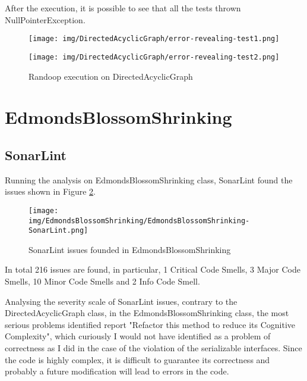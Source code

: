 \documentclass[a4paper,12pt]{article} %
\begin{document}
After the execution, it is possible to see that all the tests thrown NullPointerException.
\begin{figure}[H]
	\centering
	\begin{minipage}[b]{.9\textwidth}
		\texttt{[image: img/DirectedAcyclicGraph/error-revealing-test1.png]}	
	\end{minipage}
	\begin{minipage}[b]{.9\textwidth}
		\texttt{[image: img/DirectedAcyclicGraph/error-revealing-test2.png]}	
	\end{minipage}
\caption{Randoop execution on DirectedAcyclicGraph}
\label{fig:randtest2-graph}
\end{figure}



	\section{EdmondsBlossomShrinking}
	
	\subsection*{SonarLint}
	Running the analysis on EdmondsBlossomShrinking class, SonarLint found the issues shown in Figure \ref{fig:sonar-ed}.
	
	\begin{figure}[H]
		\centering
		\texttt{[image: img/EdmondsBlossomShrinking/EdmondsBlossomShrinking-SonarLint.png]}	
		\caption{SonarLint issues founded in EdmondsBlossomShrinking}
		\label{fig:sonar-ed}
	\end{figure}
	
	In total 216 issues are found, in particular, 1 Critical Code Smells, 3 Major Code Smells, 10 Minor Code Smells and 2 Info Code Smell.
	
	Analysing  the severity scale of SonarLint issues, contrary to the DirectedAcyclicGraph class, in the EdmondsBlossomShrinking class, the most serious problems identified report "Refactor this method to reduce its Cognitive Complexity", which curiously I would not have identified as a problem of correctness as I did in the case of the violation of the serializable interfaces. 
	Since the code is highly complex, it is difficult to guarantee its correctness and probably a future modification will lead to errors in the code.
	
\end{document}
